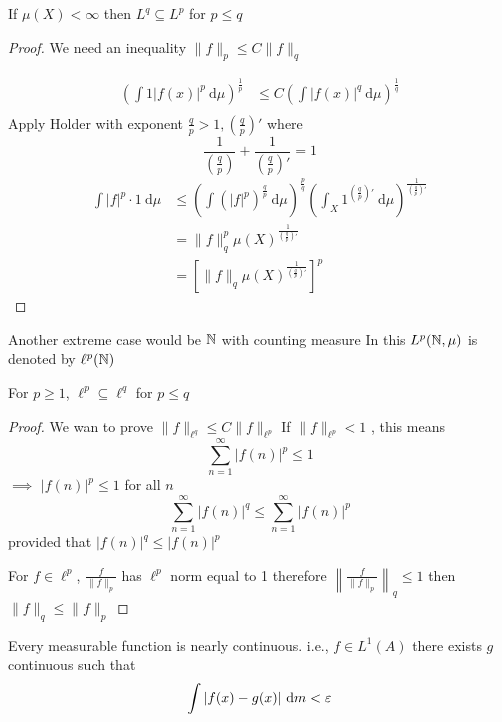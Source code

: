 \begin{theorem}
  If $\mu(X) < \infty$ then $L^q \subseteq L^p$ for $p \le q$ 
\end{theorem}

\begin{proof}
  We need an inequality $\|f\|_p \le C \|f\|_q$

  \begin{align*}
    \left(\int 1 |f(x)|^p \ \mathrm{d}\mu\right)^{\frac1p} &\le C\left(\int |f(x)|^q \ \mathrm{d}\mu\right)^{\frac1q} \\
  \end{align*}
  Apply Holder with exponent $\frac{q}{p} > 1, \left(\frac{q}{p}\right)'$ where
  \[\frac1{\left(\frac qp\right)} + \frac1{\left(\frac qp\right)'} = 1\]
  \begin{align*}
    \int |f|^p \cdot 1\ \mathrm{d}\mu &\le \left(\int (|f|^p)^\frac{q}{p} \ \mathrm{d}\mu\right)^{\frac{p}{q}}\left(\int_X 1^{\left(\frac qp\right)'} \ \mathrm{d}\mu\right)^{\frac1{\left(\frac{q}p\right)'}} \\
    &= \|f\|_q^p\mu(X)^{\frac1{\left(\frac{q}p\right)'}} \\
    &= \left[\|f\|_q \mu(X)^{\frac1{\left(\frac{q}p\right)'}}\right]^p
  \end{align*}
\end{proof}

Another extreme case would be $\mathbb N$ with counting measure 
In this $L^p(\mathbb N, \mu)$ is denoted by $\ell^p(\mathbb N)$

\begin{theorem}
  For $p \ge 1$, $\ell^p \subseteq \ell^q$ for $p \le q$
\end{theorem}

\begin{proof}
  We wan to prove $\|f\|_{\ell^q} \le C\|f\|_{\ell^p}$
  If $\|f\|_{\ell^p} < 1$ , this means 
  \[\sum_{n=1}^\infty |f(n)|^p \le 1\]
  $\implies$ $|f(n)|^p \le 1$ for all $n$
  \[\sum_{n=1}^\infty |f(n)|^q \le \sum_{n=1}^\infty |f(n)|^p\]
  provided that $|f(n)|^q \le |f(n)|^p$

  For $f \in \ell^p$, $\frac{f}{\|f\|_p}$ has $\ell^p$ norm equal to 1
  therefore $\left\|\frac f{\|f\|_p}\right\|_q \le 1$ then $\|f\|_q \le \|f\|_p$
\end{proof}

\begin{theorem}
  Every measurable function is nearly continuous. i.e.,
  $f \in L^1(A)$ there exists $g$ continuous such that
  \[\int |f(x) - g(x)| \ \mathrm{d}m < \eps\]
\end{theorem}

